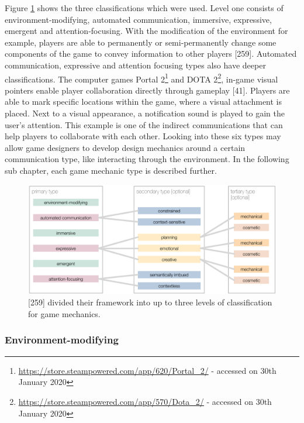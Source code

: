 Figure \ref{fig:framework_cooperative_communication_mechanics} shows the three classifications which were used. 
Level one consists of environment-modifying, automated communication, immersive, expressive, emergent and attention-focusing. With the modification of the environment for example, players are able to permanently or semi-permanently change some components of the game to convey information to other players \textcite{Toups2014ATheory}[259]. 
Automated communication, expressive and attention focusing types also have deeper classifications.
The computer games Portal 2\footnote{\url{https://store.steampowered.com/app/620/Portal_2/} - accessed on 30th January 2020} and DOTA 2\footnote{\url{https://store.steampowered.com/app/570/Dota_2/} - accessed on 30th January 2020}, in-game visual pointers enable player collaboration directly through gameplay \autocite{Vaddi2016Investigating2}[41]. 
Players are able to mark specific locations within the game, where a visual attachment is placed. Next to a visual appearance, a notification sound is played to gain the user’s attention. This example is one of the indirect communications that can help players to collaborate with each other. Looking into these six types may allow game designers to develop design mechanics around a certain communication type, like interacting through the environment.
In the following sub chapter, each game mechanic type is described further.

\begin{figure}
    \centering
    \includegraphics[scale=0.5]{images/framework_cooperative_communication_mechanics.png}
    \caption{\textcite{Toups2014ATheory}[259] divided their framework into up to three levels of classification for game mechanics.}
    \label{fig:framework_cooperative_communication_mechanics}
\end{figure}

\subsubsection{Environment-modifying}
\label{section:Environment-modifying}

